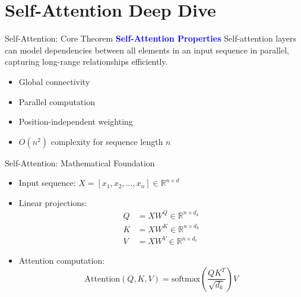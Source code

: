 \documentclass[serif, aspectratio=169]{beamer}
\begin{document}
\section{Self-Attention Deep Dive}

\begin{frame}{Self-Attention: Core Theorem}
    \textcolor{blue}{\textbf{Self-Attention Properties}}
    \newline
        Self-attention layers can model dependencies between all elements in an input sequence in parallel, capturing long-range relationships efficiently.

    \begin{itemize}
            \item Global connectivity
            \item Parallel computation
            \item Position-independent weighting
            \item $O(n^2)$ complexity for sequence length $n$
    \end{itemize}
\end{frame}

\begin{frame}{Self-Attention: Mathematical Foundation}
    \begin{itemize}
        \item Input sequence: $X = [x_1, x_2, ..., x_n] \in \mathbb{R}^{n \times d}$
        \item Linear projections:
        \begin{align*}
            Q &= XW^Q \in \mathbb{R}^{n \times d_k} \\
            K &= XW^K \in \mathbb{R}^{n \times d_k} \\
            V &= XW^V \in \mathbb{R}^{n \times d_v}
        \end{align*}
        \item Attention computation:
        \begin{equation*}
            \text{Attention}(Q, K, V) = \text{softmax}\left(\frac{QK^T}{\sqrt{d_k}}\right)V
        \end{equation*}
    \end{itemize}
\end{frame}
\end{document}
